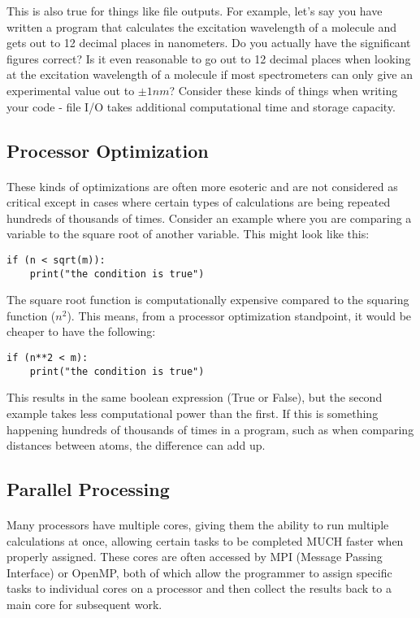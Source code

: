 This is also true for things like file outputs.
For example, let's say you have written a program that calculates the excitation wavelength of a molecule and gets out to 12 decimal places in nanometers.
Do you actually have the significant figures correct?
Is it even reasonable to go out to 12 decimal places when looking at the excitation wavelength of a molecule if most spectrometers can only give an experimental value out to $\pm1nm$?
Consider these kinds of things when writing your code - file I/O takes additional computational time and storage capacity.

\subsection*{Processor Optimization}
\paragraph{} These kinds of optimizations are often more esoteric and are not considered as critical except in cases where certain types of calculations are being repeated hundreds of thousands of times.
Consider an example where you are comparing a variable to the square root of another variable.
This might look like this:

\begin{verbatim}
if (n < sqrt(m)):
    print("the condition is true")
\end{verbatim}

The square root function is computationally expensive compared to the squaring function ($n^2$).
This means, from a processor optimization standpoint, it would be cheaper to have the following:

\begin{verbatim}
if (n**2 < m):
    print("the condition is true")
\end{verbatim}

This results in the same boolean expression (True or False), but the second example takes less computational power than the first.  
If this is something happening hundreds of thousands of times in a program, such as when comparing distances between atoms, the difference can add up.  

\subsection*{Parallel Processing}
\paragraph{}Many processors have multiple cores, giving them the ability to run multiple calculations at once, allowing certain tasks to be completed MUCH faster when properly assigned.
These cores are often accessed by MPI (Message Passing Interface) or OpenMP, both of which allow the programmer to assign specific tasks to individual cores on a processor and then collect the results back to a main core for subsequent work.

